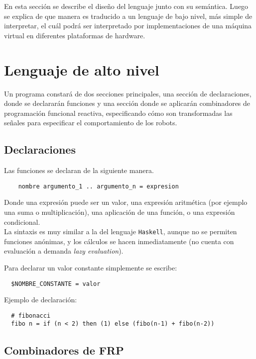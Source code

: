En esta sección se describe el diseño del lenguaje junto con su semántica.
Luego se explica de que manera es traducido a un lenguaje de bajo nivel, más
simple de interpretar, el cuál podrá ser interpretado por implementaciones de
una máquina virtual en diferentes plataformas de hardware.

\section{Lenguaje de alto nivel}

  Un programa constará de dos secciones principales, una sección de declaraciones, donde
se declararán funciones y una sección donde se aplicarán combinadores de programación
funcional reactiva, especificando cómo son transformadas las señales para especificar
el comportamiento de los robots.

\subsection{Declaraciones}

  Las funciones se declaran de la siguiente manera.

\begin{verbatim}
    nombre argumento_1 .. argumento_n = expresion
\end{verbatim}

  Donde una expresión puede ser un valor,
una expresión aritmética (por ejemplo una suma o multiplicación),
una aplicación de una función, o una expresión condicional.\\

  La sintaxis es muy similar a la del lenguaje \texttt{Haskell}, aunque
no se permiten funciones anónimas, y los cálculos se hacen
inmediatamente (no cuenta con evaluación a demanda \emph{lazy evaluation}).

  Para declarar un valor constante simplemente se escribe:

\begin{verbatim}
  $NOMBRE_CONSTANTE = valor
\end{verbatim}

  Ejemplo de declaración:

\begin{verbatim}
  # fibonacci
  fibo n = if (n < 2) then (1) else (fibo(n-1) + fibo(n-2))
\end{verbatim}

\subsection{Combinadores de FRP}

